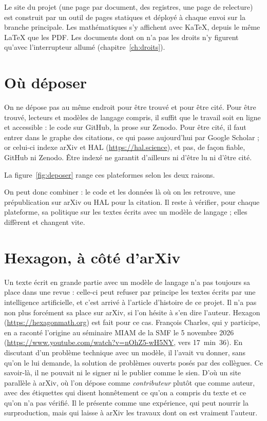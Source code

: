 Le site du projet (une page par document, des registres, une page de relecture) est
construit par un outil de pages statiques et déployé à chaque envoi sur la branche
principale. Les mathématiques s'y affichent avec KaTeX, depuis le même LaTeX que les PDF.
Les documents dont on n'a pas les droits n'y figurent qu'avec l'interrupteur allumé
(chapitre~\ref{ch:droits}).

\section{Où déposer}

On ne dépose pas au même endroit pour être trouvé et pour être cité. Pour être trouvé,
lecteurs et modèles de langage compris, il suffit que le travail soit en ligne et
accessible : le code sur GitHub, la prose sur Zenodo. Pour être cité, il faut entrer dans
le graphe des citations, ce qui passe aujourd'hui par Google Scholar ; or celui-ci indexe
arXiv et HAL (\url{https://hal.science}), et pas, de façon fiable, GitHub ni Zenodo. Être indexé ne garantit
d'ailleurs ni d'être lu ni d'être cité.

La figure~\ref{fig:deposer} range ces plateformes selon les deux raisons.



On peut donc combiner : le code et les données là où on les retrouve, une prépublication
sur arXiv ou HAL pour la citation. Il reste à vérifier, pour chaque plateforme, sa politique
sur les textes écrits avec un modèle de langage ; elles diffèrent et changent vite.

\section{Hexagon, à côté d'arXiv}

Un texte écrit en grande partie avec un modèle de langage n'a pas toujours sa place dans une
revue : celle-ci peut refuser par principe les textes écrits par une intelligence
artificielle, et c'est arrivé à l'article d'histoire de ce projet. Il n'a pas non plus
forcément sa place sur arXiv, si l'on hésite à s'en dire l'auteur. Hexagon
(\url{https://hexagonmath.org}) est fait pour ce cas. François Charles, qui y participe, en
a raconté l'origine au séminaire MIAM de la SMF le 5 novembre 2026
(\url{https://www.youtube.com/watch?v=nOhZ5-wH5NY}, vers 17~min~36). En discutant d'un
problème technique avec un modèle, il l'avait vu donner, sans qu'on le lui demande, la
solution de problèmes ouverts posés par des collègues. Ce savoir-là, il ne pouvait ni le
signer ni le publier comme le sien. D'où un site parallèle à arXiv, où l'on dépose comme
\emph{contributeur} plutôt que comme auteur, avec des étiquettes qui disent honnêtement ce
qu'on a compris du texte et ce qu'on n'a pas vérifié. Il le présente comme une expérience,
qui peut nourrir la surproduction, mais qui laisse à arXiv les travaux dont on est
vraiment l'auteur.

